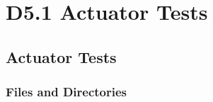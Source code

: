 \documentclass{CSSRforAfrica}
\begin{document}

\section{D5.1 Actuator Tests}

\subsection{Actuator Tests}

\subsubsection{Files and Directories}
\end{document}
